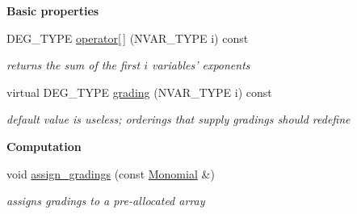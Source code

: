 \begin{Indent}\textbf{ Basic properties}\par
\begin{DoxyCompactItemize}
\item 
\mbox{\label{class_grevlex___order___data_aa493ca0ff50ec991894bb95de918e12b}} 
D\+E\+G\+\_\+\+T\+Y\+PE \hyperlink{class_grevlex___order___data_aa493ca0ff50ec991894bb95de918e12b}{operator\mbox{[}$\,$\mbox{]}} (N\+V\+A\+R\+\_\+\+T\+Y\+PE i) const
\begin{DoxyCompactList}\small\item\em returns the sum of the first $i$ variables' exponents \end{DoxyCompactList}\item 
\mbox{\label{class_grevlex___order___data_a0dc7b7051db1e8314dec67d40d79c275}} 
virtual D\+E\+G\+\_\+\+T\+Y\+PE \hyperlink{class_grevlex___order___data_a0dc7b7051db1e8314dec67d40d79c275}{grading} (N\+V\+A\+R\+\_\+\+T\+Y\+PE i) const
\begin{DoxyCompactList}\small\item\em default value is useless; orderings that supply gradings should redefine \end{DoxyCompactList}\end{DoxyCompactItemize}
\end{Indent}
\begin{Indent}\textbf{ Computation}\par
\begin{DoxyCompactItemize}
\item 
void \hyperlink{class_grevlex___order___data_aeaf81375ec0b27a6e9c047b1d63c6d55}{assign\+\_\+gradings} (const \hyperlink{class_monomial}{Monomial} \&)
\begin{DoxyCompactList}\small\item\em assigns gradings to a pre-\/allocated array \end{DoxyCompactList}\end{DoxyCompactItemize}
\end{Indent}
